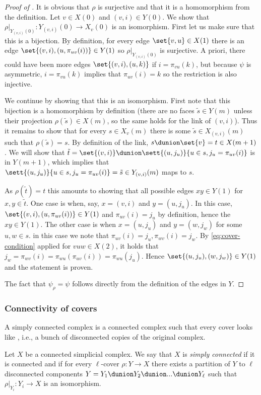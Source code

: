 \begin{proof}[Proof of ]
It is obvious that \(\rho\) is surjective and that it is a homomorphism from the definition. Let \(v \in X(0)\) and \((v,i) \in Y(0)\). We show that \(\rho|_{Y_{(v,i)}(0)}:Y_{(v,i)}(0) \to X_v(0)\) is an isomorphism. First let us make sure that this is a bijection. By definition, for every edge \(\set{v,u} \in X(1)\) there is an edge \(\set{(v,i),(u,\pi_{uv}(i))} \in Y(1)\) so \(\rho|_{Y_{(v,i)}(0)}\) is surjective. A priori, there could have been more edges \(\set{(v,i),(u,k)}\) if \(i=\pi_{vu}(k)\), but because \(\psi\) is asymmetric, \(i=\pi_{vu}(k)\) implies that \(\pi_{uv}(i)=k\) so the restriction is also injective.

We continue by showing that this is an isomorphism. First note that this bijection is a homomorphism by definition (there are no faces \(\tilde{s} \in Y(m)\) unless their projection \(\rho(\tilde{s}) \in X(m)\), so the same holds for the link of \((v,i)\)). Thus it remains to show that for every \(s \in X_v(m)\) there is some \(\tilde{s} \in X_{(v,i)}(m)\) such that \(\rho(\tilde{s})=s\). By definition of the link, \(s \dunion \set{v}=t \in X(m+1)\). We will show that
\(\tilde{t}=\set{(v,i)} \dunion \sett{(u,j_u)}{u \in s, j_u=\pi_{uv}(i)}\) is in \(Y(m+1)\), which implies that \(\sett{(u,j_u)}{u \in s, j_u=\pi_{uv}(i)}=\tilde{s} \in Y_{(v,i)}(m)\) maps to \(s\).

As \(\rho(\tilde{t})=t\) this amounts to showing that all possible edges \(xy \in Y(1)\) for \(x,y \in \tilde{t}\). One case is when, say, \(x=(v,i)\) and \(y=(u,j_u)\). In this case, \(\set{(v,i),(u,\pi_{uv}(i))} \in Y(1)\) and \(\pi_{uv}(i)=j_u\) by definition, hence the \(xy \in Y(1)\). The other case is when \(x=(u,{j_u})\) and \(y=(w,{j_w})\) for some \(u,w \in s\). in this case we note that \(\pi_{uv}(i)=j_u, \pi_{wv}(i)=j_w\). By \eqref{eq:cover-condition} applied for \(vuw \in X(2)\), it holds that \(j_w=\pi_{wv}(i)=\pi_{wu}(\pi_{uv}(i))=\pi_{wu}(j_u)\). Hence \(\set{(u,{j_u}),(w,{j_w})} \in Y(1)\) and the statement is proven.

The fact that \(\psi_{\rho}=\psi\) follows directly from the definition of the edges in \(Y\).
\end{proof}

\subsubsection{Connectivity of covers}
A simply connected complex is a connected complex such that every cover looks like , i.e., a bunch of disconnected copies of the original complex.
\begin{definition}
    Let \(X\) be a connected simplicial complex. We say that \(X\) is \emph{simply connected} if it is connected and if for every \(\ell\)-cover \(\rho:Y \to X\) there exists a partition of \(Y\) to \(\ell\) disconnected components \(Y= Y_1 \dunion Y_2 \dunion ... \dunion Y_\ell\) such that \(\rho|_{Y_i}:Y_i \to X\) is an isomorphism.
\end{definition}

